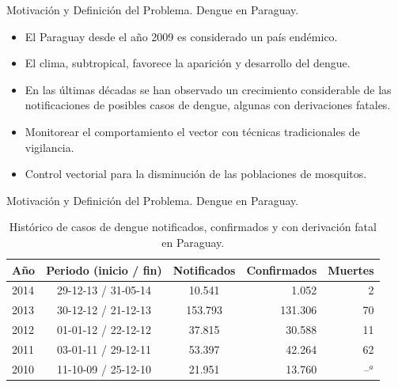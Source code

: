 \begin{frame}[t]{Motivación y Definición del Problema. Dengue en Paraguay.}
  \begin{center}
    \begin{itemize}
    \item El Paraguay desde el año 2009 es considerado un país endémico.

    \item El clima, subtropical, favorece la aparición y desarrollo del dengue.

    \item En las últimas décadas se han observado un crecimiento considerable de las notificaciones de posibles casos de dengue, algunas con derivaciones fatales.

    \item Monitorear el comportamiento el vector con técnicas tradicionales de vigilancia.

    \item Control vectorial para la disminución de las poblaciones de mosquitos.
    \end{itemize}
  \end{center}
\end{frame}


\begin{frame}[t]{Motivación y Definición del Problema. Dengue en Paraguay.}
  \begin{center}
  \begin{table}
      \begin{minipage}{\textwidth}
          \begin{center}
          \caption{Histórico de casos de dengue notificados, confirmados y con derivación fatal en Paraguay.}
          \begin{tabular}{l c c r r}
              \hline
              Año & Periodo (inicio / fin) & Notificados & Confirmados & Muertes\\
              \hline
              \hline
              2014 & 29-12-13 / 31-05-14 & 10.541 & 1.052 & 2\\
              2013 & 30-12-12 / 21-12-13 & 153.793 & 131.306 & 70\\
              2012 & 01-01-12 / 22-12-12 & 37.815 & 30.588 & 11\\
              2011 & 03-01-11 / 29-12-11 & 53.397 & 42.264 & 62\\
              2010 & 11-10-09 / 25-12-10 & 21.951 & 13.760 & --$^a$
          \end{tabular}
          \end{center}
      \end{minipage}
  \end{table}
  \end{center}
\end{frame}

